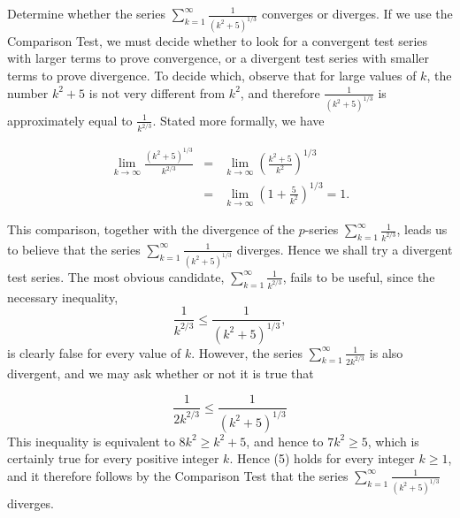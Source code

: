 \begin{example} Determine whether the series $\sum_{k=1}^\infty \frac{1}{(k^2 + 5)^{1/3}}$ converges or diverges. If we use the Comparison Test, we must decide whether to look for a convergent test series with larger terms to prove convergence, or a divergent test series with smaller terms to prove divergence. To decide which, observe that for large values of $k$, the number $k^2 + 5$ is not very different from $k^2$, and therefore $\frac{1}{(k^2 + 5)^{1/3}}$ is approximately equal to $\frac{1}{k^{2/3}}$. Stated more formally, we have

\begin{eqnarray*}
\lim_{k \rightarrow \infty} \frac{(k^2 + 5)^{1/3}}{k^{2/3}} &=& \lim_{k \rightarrow \infty} (\frac{k^2 + 5}{k^2})^{1/3}  \\
&=& \lim_{k \rightarrow \infty}(1 + \frac{5}{k^2})^{1/3} = 1.
\end{eqnarray*}

\noindent This comparison, together with the divergence of the $p$-series $\sum_{k=1}^\infty \frac{1}{k^{2/3}}$, leads us to believe that the series $\sum_{k=1}^\infty \frac{1}{(k^2 + 5)^{1/3}}$ diverges. Hence we shall try a
\noindent divergent test series. The most obvious candidate, $\sum_{k=1}^\infty \frac{1}{k^{2/3}}$, fails to be useful, since the necessary inequality,  
$$
\frac{1}{k^{2/3}} \leq \frac{1}{(k^2 + 5)^{1/3}},   
$$
\noindent is clearly false for every value of $k$. However, the series $\sum_{k=1}^\infty \frac{1}{2k^{2/3}}$ is also divergent, and we may ask whether or not it is true that


\begin{equation}
\frac{1}{2k^{2/3}} \leq \frac{1}{(k^2 + 5)^{1/3}}
\label{eq9.3.5}
\end{equation}
\noindent This inequality is equivalent to $8k^2 \geq k^2 + 5$, and hence to $7k^2 \geq 5$, which is certainly true for every positive integer $k$. Hence (5) holds for every integer $k \geq 1$, and it therefore follows by the Comparison Test that the series $\sum_{k=1}^\infty \frac{1}{(k^2 + 5)^{1/3}}$ diverges.
\end{example}

